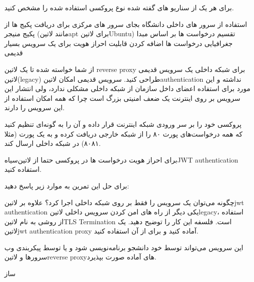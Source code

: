 \documentclass{../assignment}
\begin{document}

برای هر یک از سناریو های گفته شده نوع پروکسی استفاده شده را مشخص کنید.

 استفاده از سرور های داخلی دانشگاه بجای سرور های مرکزی برای دریافت پکیج ها از پکیج منیجر (مانند ‌لاتین{apt} برای ‌لاتین{Ubuntu})
 تقسیم درخواست ها بر اساس مبدا جغرافیایی درخواست ها
 اضافه کردن قابلیت احراز هویت برای یک سرویس بسیار قدیمی



از شما خواسته شده تا یک ‌لاتین {reverse proxy} برای شبکه داخلی یک سرویس قدیمی ‌لاتین{(legacy)} طراحی کنید.
سرویس قدیمی امکان ‌لاتین{authentication} نداشته و این مورد برای استفاده اعضای داخل سازمان از شبکه داخلی مشکلی ندارد، ولی انتشار این سرویس بر روی اینترنت یک ضعف امنیتی بزرگ است چرا که همه امکان استفاده از این سرویس را دارند.

پروکسی خود را بر سر ورودی شبکه اینترنت قرار داده و آن را به گونه‌ای تنظیم کنید که همه درخواست‌های پورت ۸۰ را از شبکه خارجی دریافت کرده و به یک پورت (مثلا ۸۰۸۱) در شبکه داخلی ارسال کند.

برای احراز هویت درخواست ها در پروکسی حتما از ‌لاتین{‌سیاه{JWT authentication}} استفاده کنید.

برای حل این تمرین به موارد زیر پاسخ دهید:

 چگونه می‌توان یک سرویس را فقط بر روی شبکه داخلی اجرا کرد؟
 علاوه بر ‌لاتین{jwt authentication} یکی دیگر از راه های امن کردن سرویس داخلی ‌لاتین{legacy}، استفاده از روشی به نام ‌لاتین{TLS Termination} است. فلسفه این کار را توضیح دهید.
 یک ‌لاتین{jwt authentication proxy} آماده کنید و برای  از آن استفاده کنید.

این سرویس می‌تواند توسط خود دانشجو برنامه‌نویسی شود و یا توسط پیکربندی وب سرورها و ‌لاتین{reverse proxy}های آماده صورت بپذیرد.

‌ساز
\end{document}
